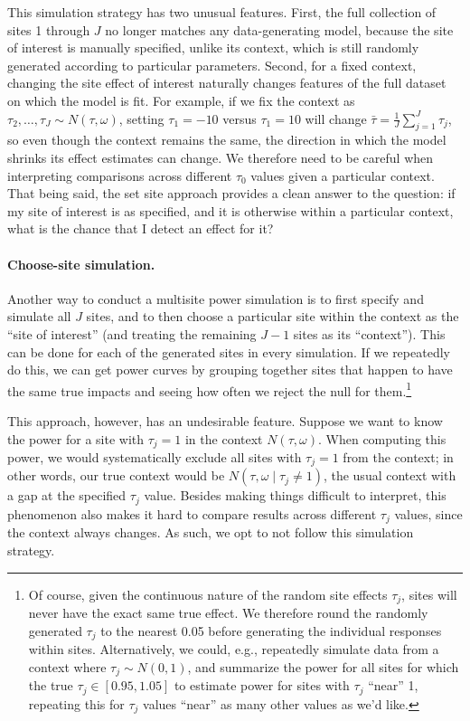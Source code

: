 \documentclass[]{article}
\begin{document}
This simulation strategy has two unusual features.
First, the full collection of sites 1 through $J$ no longer matches any data-generating model, because the site of interest is manually specified, unlike its context, which is still randomly generated according to particular parameters.
Second, for a fixed context, changing the site effect of interest naturally changes features of the full dataset on which the model is fit.
For example, if we fix the context as $\tau_2, \dots, \tau_J \sim N(\tau, \omega)$, setting $\tau_1 = -10$ versus $\tau_1 = 10$ will change $\bar{\tau} = \frac{1}{J} \sum_{j=1}^{J} \tau_j$, so even though the context remains the same, the direction in which the model shrinks its effect estimates can change.
We therefore need to be careful when interpreting comparisons across different $\tau_0$ values given a particular context.
That being said, the set site approach provides a clean answer to the question: if my site of interest is as specified, and it is otherwise within a particular context, what is the chance that I detect an effect for it?

\paragraph{Choose-site simulation.} Another way to conduct a multisite power simulation is to first specify and simulate all $J$ sites, and to then choose a particular site within the context as the ``site of interest'' (and treating the remaining $J-1$ sites as its ``context'').
This can be done for each of the generated sites in every simulation.
If we repeatedly do this, we can get power curves by grouping together sites that happen to have the same true impacts and seeing how often we reject the null for them.\footnote{Of course, given the continuous nature of the random site effects $\tau_j$, sites will never have the exact same true effect.
We therefore round the randomly generated $\tau_j$ to the nearest 0.05 before generating the individual responses within sites.
Alternatively, we could, e.g., repeatedly simulate data from a context where $\tau_j \sim N(0, 1)$, and summarize the power for all sites for which the true $\tau_j \in [0.95, 1.05]$ to estimate  power for sites with $\tau_j$ ``near'' 1, repeating this for $\tau_j$ values ``near'' as many other values as we'd like.}

This approach, however, has an undesirable feature.
Suppose we want to know the power for a site with $\tau_j = 1$ in the context $N(\tau, \omega)$.
When computing this power, we would systematically exclude all sites with $\tau_j = 1$ from the context; in other words, our true context would be $N(\tau, \omega \mid \tau_j \neq 1)$, the usual context with a gap at the specified $\tau_j$ value.
Besides making things difficult to interpret, this phenomenon also makes it hard to compare results across different $\tau_j$ values, since the context always changes.
As such, we opt to not follow this simulation strategy.
\end{document}
